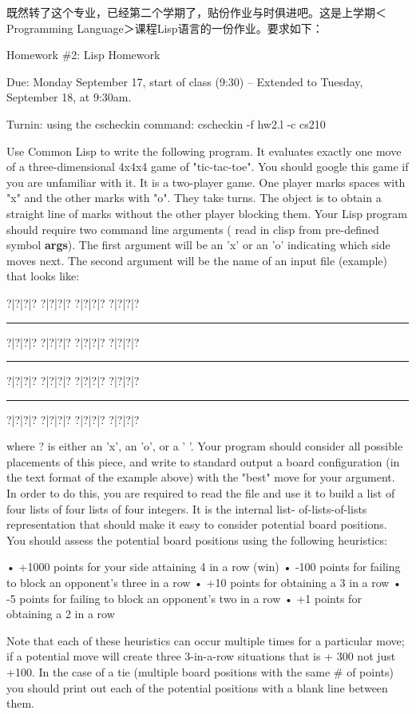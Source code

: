 \documentclass[12pt]{book}
\begin{document}
既然转了这个专业，已经第二个学期了，贴份作业与时俱进吧。这是上学期＜
Programming Language＞课程Lisp语言的一份作业。要求如下：

Homework \#2: Lisp Homework 

Due: Monday September 17, start of class (9:30) -- Extended to Tuesday, 
September 18, at 9:30am.

Turnin: using the cscheckin command: 
cscheckin -f hw2.l -c cs210

Use Common Lisp to write the following program. It evaluates exactly one 
move of a three-dimensional 4x4x4 game of "tic-tac-toe". You should google 
this game if you are unfamiliar with it. It is a two-player game. One player
marks spaces with "x" and the other marks with "o". They take turns. The 
object is to obtain a straight line of marks without the other player 
blocking them. Your Lisp program should require two command line arguments (
read in clisp from pre-defined symbol \textbf{args}). The first argument will be an
'x' or an 'o' indicating which side moves next. The second argument will be
the name of an input file (example) that looks like: 

?|?|?|?   ?|?|?|?   ?|?|?|?   ?|?|?|?

\rule{\linewidth}{0.5pt}
?|?|?|?   ?|?|?|?   ?|?|?|?   ?|?|?|?

\rule{\linewidth}{0.5pt}
?|?|?|?   ?|?|?|?   ?|?|?|?   ?|?|?|?

\rule{\linewidth}{0.5pt}
?|?|?|?   ?|?|?|?   ?|?|?|?   ?|?|?|?

where ? is either an 'x', an 'o', or a ' '. Your program should consider all
possible placements of this piece, and write to standard output a board 
configuration (in the text format of the example above) with the "best" move
for your argument. 
In order to do this, you are required to read the file and use it to build a
list of four lists of four lists of four integers. It is the internal list-
of-lists-of-lists representation that should make it easy to consider 
potential board positions. You should assess the potential board positions 
using the following heuristics: 

•    +1000 points for your side attaining 4 in a row (win) 
•    -100 points for failing to block an opponent's three in a row 
•    +10 points for obtaining a 3 in a row 
•    -5 points for failing to block an opponent's two in a row 
•    +1 points for obtaining a 2 in a row 

Note that each of these heuristics can occur multiple times for a particular
move; if a potential move will create three 3-in-a-row situations that is +
300 not just +100. 
In the case of a tie (multiple board positions with the same \# of points) 
you should print out each of the potential positions with a blank line 
between them. 
\end{document}
